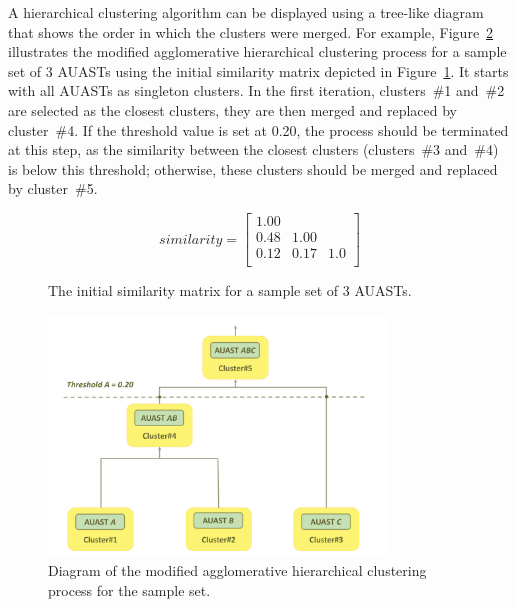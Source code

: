 A hierarchical clustering algorithm can be displayed using a tree-like diagram that shows the order in which the clusters were merged. For example, Figure~\ref{fig:overview2} illustrates the modified agglomerative hierarchical clustering process for a sample set of 3 AUASTs using the initial similarity matrix depicted in Figure~\ref{matrix}. It starts with all AUASTs as singleton clusters. In the first iteration, clusters~\#1 and~\#2 are selected as the closest clusters, they are then merged and replaced by cluster~\#4. If the threshold value is set at 0.20, the process should be terminated at this step, as the similarity between the closest clusters (clusters~\#3 and~\#4) is below this threshold; otherwise, these clusters should be merged and replaced by cluster~\#5.





\begin{figure}[h]
  \centering
    \centering
   \begin{displaymath}
    similarity = \left[
        \begin{matrix}
        1.00 &  &     \\
0.48 & 1.00 &    \\
0.12 & 0.17 & 1.0   \\
        \end{matrix}   \right]
\end{displaymath}
 \caption{The initial similarity matrix for a sample set of 3 AUASTs.}
  \label{matrix}
  \end{figure}

  \begin{figure} [h]

   \centering\includegraphics [width = 0.8\textwidth]{Drawing4/clustering.pdf}
  \caption{Diagram of the modified agglomerative hierarchical clustering process for the sample set.}
  \label{fig:overview2}
\end{figure}


